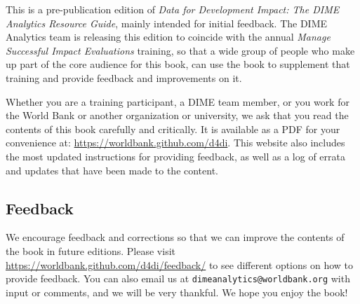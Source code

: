 This is a pre-publication edition of
\textit{Data for Development Impact:
The DIME Analytics Resource Guide}, mainly intended for initial feedback.
The DIME Analytics team is releasing this edition
to coincide with the annual \textit{Manage Successful Impact Evaluations} training,
so that a wide group of people who make up
part of the core audience for this book,
can use the book to supplement that training
and provide feedback and improvements on it.

Whether you are a training participant,
a DIME team member, or you work for the World Bank
or another organization or university,
we ask that you read the contents of this book carefully and critically.
It is available as a PDF for your convenience at:
\url{https://worldbank.github.com/d4di}.
This website also includes the most updated instructions
for providing feedback, as well as
a log of errata and updates that have been made to the content.

\subsection{Feedback}

We encourage feedback and corrections
so that we can improve the contents of the book
in future editions. Please visit 
\url{https://worldbank.github.com/d4di/feedback/} to 
see different options on how to provide feedback.
You can also email us at \texttt{dimeanalytics@worldbank.org}
with input or comments, and we will be very thankful.
We hope you enjoy the book!
